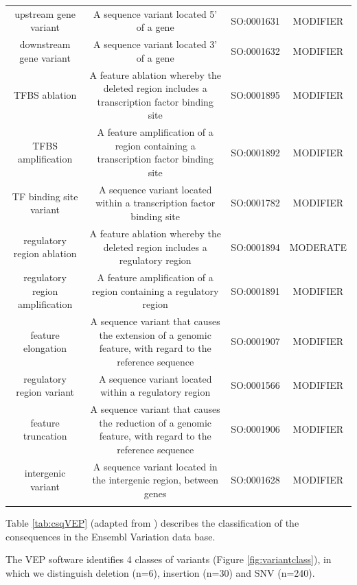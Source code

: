{\begin{table}
\begin{adjustbox}{width=1\textwidth}
\begin{tabular}{c c c c}
upstream gene variant & A sequence variant located 5' of a gene & SO:0001631 & MODIFIER \\
downstream gene variant & A sequence variant located 3' of a gene & SO:0001632 & MODIFIER \\
TFBS ablation & A feature ablation whereby the deleted region includes a transcription factor binding site & SO:0001895 & MODIFIER \\
TFBS amplification & A feature amplification of a region containing a transcription factor binding site & SO:0001892 & MODIFIER \\
TF binding site variant & A sequence variant located within a transcription factor binding site & SO:0001782 & MODIFIER \\
regulatory region ablation & A feature ablation whereby the deleted region includes a regulatory region & SO:0001894 & MODERATE \\
regulatory region amplification & A feature amplification of a region containing a regulatory region & SO:0001891 & MODIFIER \\
feature elongation & A sequence variant that causes the extension of a genomic feature, with regard to the reference sequence & SO:0001907 & MODIFIER \\
regulatory region variant & A sequence variant located within a regulatory region & SO:0001566 & MODIFIER \\
feature truncation & A sequence variant that causes the reduction of a genomic feature, with regard to the reference sequence & SO:0001906 & MODIFIER \\
intergenic variant & A sequence variant located in the intergenic region, between genes & SO:0001628 & MODIFIER \\
\bottomrule\\
\end{tabular}
\end{adjustbox}
\end{table}
}

Table \ref{tab:csqVEP} (adapted from \cite{mclaren2016ensembl}) describes the classification of the consequences in the Ensembl Variation data base.

The VEP software identifies 4 classes of variants (Figure \ref{fig:variantclass}), in which we distinguish deletion (n=6), insertion (n=30) and SNV (n=240).



